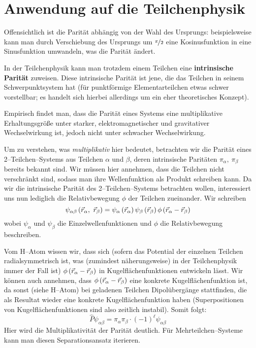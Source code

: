 \documentclass[Ex4_Zusammenfassung.tex]{subfiles}
\begin{document}
\section{Anwendung auf die Teilchenphysik}
Offensichtlich ist die Parität abhängig von der Wahl des Ursprungs: beispielsweise kann man durch Verschiebung des Ursprungs um $\nicefrac{\pi}{2}$ eine Kosinusfunktion in eine Sinusfunktion umwandeln, was die Parität ändert. 

In der Teilchenphysik kann man trotzdem einem Teilchen eine \textbf{intrinsische Parität} zuweisen. Diese intrinsische Parität ist jene, die das Teilchen in seinem Schwerpunktsystem hat (für punktförmige Elementarteilchen etwas schwer vorstellbar; es handelt sich hierbei allerdings um ein eher theoretisches Konzept). 

Empirisch findet man, dass die Parität eines Systems eine multiplikative Erhaltungsgröße unter starker, elektromagnetischer und gravitativer Wechselwirkung ist, jedoch nicht unter schwacher Wechselwirkung. 

Um zu verstehen, was \textit{multiplikativ} hier bedeutet, betrachten wir die Parität eines 2--Teilchen--Systems aus Teilchen $\alpha$ und $\beta$, deren intrinsische Paritäten $\pi_\alpha,\ \pi_\beta$ bereits bekannt sind. Wir müssen hier annehmen, dass die Teilchen nicht verschränkt sind, sodass man ihre Wellenfunktion als Produkt schreiben kann. Da wir die intrinsische Parität des 2--Teilchen--Systems betrachten wollen, interessiert uns nun lediglich die Relativbewegung $\phi$ der Teilchen zueinander. Wir schreiben
\begin{equation}
	\psi_{\alpha \beta} \lp \vec{r}_\alpha ,\ \vec{r}_\beta \rp = \psi_\alpha \lp \vec{r}_\alpha \rp \psi_\beta \lp \vec{r}_\beta \rp \phi \lp \vec{r}_\alpha - \vec{r}_\beta\rp
\end{equation}
wobei $\psi_\alpha$ und $\psi_\beta$ die Einzelwellenfunktionen und $\phi$ die Relativbewegung beschreiben. 

Vom H--Atom wissen wir, dass sich (sofern das Potential der einzelnen Teilchen radialsymmetrisch ist, was (zumindest näherungsweise) in der Teilchenphysik immer der Fall ist) $\phi \left( \vec{r}_\alpha - \vec{r}_\beta\right)$ in Kugelflächenfunktionen entwickeln lässt. Wir können auch annehmen, dass $\phi \left( \vec{r}_\alpha - \vec{r}_\beta\right)$ eine konkrete Kugelflächenfunktion ist, da sonst (siehe H--Atom) bei geladenen Teilchen Dipolübergänge stattfinden, die als Resultat wieder eine konkrete Kugelflächenfunktion haben (Superpositionen von Kugelflächenfunktionen sind also zeitlich instabil). Somit folgt:
\begin{equation}
	\hat{P}\psi_{\alpha \beta} = \pi_\alpha \pi_\beta \cdot (-1)^\ell \psi_{\alpha \beta}
\end{equation}
Hier wird die Multiplikativität der Parität deutlich. Für Mehrteilchen--Systeme kann man diesen Separationsansatz iterieren. 
\end{document}
